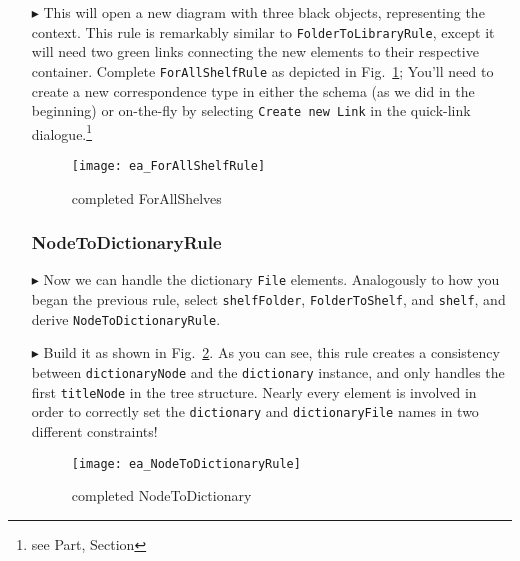 \begin{itemize}
\item[$\blacktriangleright$] This will open a new diagram with three black objects, representing the context. This rule is remarkably similar to
\texttt{FolderToLibraryRule}, except it will need two green links connecting the new elements to their respective container. Complete \texttt{ForAllShelfRule}
as depicted in Fig.~\ref{ea:ForAllShelves_Complete}; You'll need to create a new correspondence type in either the schema (as we did
in the beginning) or on-the-fly by selecting \texttt{Create new Link} in the quick-link dialogue.\footnote{see Part, Section \update}

\clearpage

\begin{figure}[htbp]
\begin{center}
  \texttt{[image: ea\_ForAllShelfRule]}
  \caption{completed ForAllShelves}
  \label{ea:ForAllShelves_Complete}
\end{center}
\end{figure}

\subsubsection{NodeToDictionaryRule} %

\item[$\blacktriangleright$] Now we can handle the dictionary \texttt{File} elements. Analogously to how you began the previous rule, select
\texttt{shelfFolder}, \texttt{FolderToShelf}, and \texttt{shelf}, and derive \texttt{NodeToDictionaryRule}.

\item[$\blacktriangleright$] Build it as shown in Fig.~\ref{ea:NodeToDictionary_Complete}. As you can see, this rule creates a consistency between
\texttt{dictionaryNode} and the \texttt{dictionary} instance, and only handles the first \texttt{titleNode} in the tree structure. Nearly every element is
involved in order to correctly set the \texttt{dictionary} and \texttt{dictionaryFile} names in two different constraints!

\begin{figure}[htbp]
\begin{center}
  \texttt{[image: ea\_NodeToDictionaryRule]}
  \caption{completed NodeToDictionary}
  \label{ea:NodeToDictionary_Complete}
\end{center}
\end{figure}



\end{itemize}
